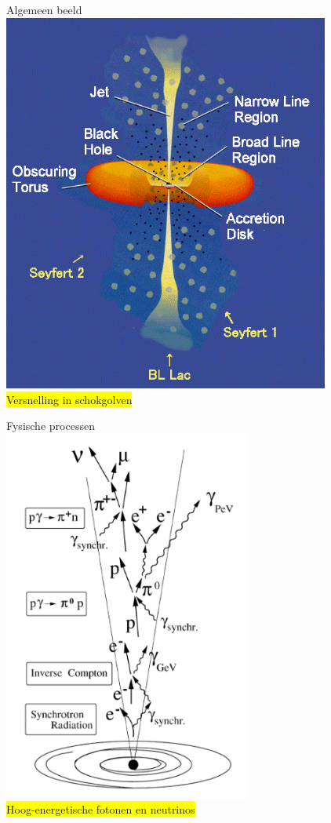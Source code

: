 \Tr
\twocolumn
\begin{center}
{\blue Algemeen beeld}\\[2mm]
\includegraphics[keepaspectratio,height=12.5cm]{agn-1}\\[5mm]
\colorbox{yellow}{Versnelling in schokgolven}
\end{center}

\newpage

\begin{center}
{\blue Fysische processen}\\[5mm]
\includegraphics[keepaspectratio,height=12.3cm]{jet}\\[5mm]
\colorbox{yellow}{Hoog-energetische fotonen en neutrinos}
\end{center}
